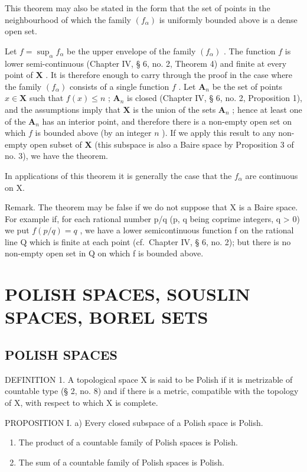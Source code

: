 This theorem may also be stated in the form that the set of points in the neighbourhood of which the family \((f_{\alpha})\) is uniformly bounded above is a dense open set.

Let \(f = \sup_{\alpha} f_{\alpha}\) be the upper envelope of the family \((f_{\alpha})\) . The function \(f\) is lower semi-continuous (Chapter IV, § 6, no. 2, Theorem 4) and finite at every point of \(\mathbf{X}\) . It is therefore enough to carry through the proof in the case where the family \((f_{\alpha})\) consists of a single function \(f\) . Let \(\mathbf{A}_n\) be the set of points \(x \in \mathbf{X}\) such that \(f(x) \leqslant n\) ; \(\mathbf{A}_n\) is closed (Chapter IV, § 6, no. 2, Proposition 1), and the assumptions imply that \(\mathbf{X}\) is the union of the sets \(\mathbf{A}_n\) ; hence at least one of the \(\mathbf{A}_n\) has an interior point, and therefore there is a non-empty open set on which \(f\) is bounded above (by an integer \(n\) ). If we apply this result to any non-empty open subset of \(\mathbf{X}\) (this subspace is also a Baire space by Proposition 3 of no. 3), we have the theorem.

In applications of this theorem it is generally the case that the \(f_{\alpha}\) are continuous on X.

Remark. The theorem may be false if we do not suppose that X is a Baire space. For example if, for each rational number p/q (p, q being coprime integers, q \textgreater{} 0) we put \(f(p/q) = q\) , we have a lower semicontinuous function f on the rational line Q which is finite at each point (cf.~Chapter IV, § 6, no. 2); but there is no non-empty open set in Q on which f is bounded above.

\section{POLISH SPACES, SOUSLIN SPACES, BOREL SETS}

\subsection{POLISH SPACES}

DEFINITION 1. A topological space X is said to be Polish if it is metrizable of countable type (§ 2, no. 8) and if there is a metric, compatible with the topology of X, with respect to which X is complete.

PROPOSITION I. a) Every closed subspace of a Polish space is Polish.

\begin{enumerate}
\def\labelenumi{\alph{enumi})}
\setcounter{enumi}{1}
\item
  The product of a countable family of Polish spaces is Polish.
\item
  The sum of a countable family of Polish spaces is Polish.
\end{enumerate}

